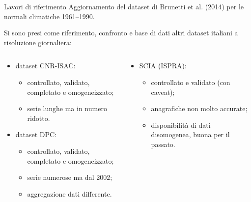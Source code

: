 \begin{frame}[t]{Lavori di riferimento}
  Aggiornamento del dataset di Brunetti et al. (2014) per le normali climatiche 1961--1990.

  Si sono presi come riferimento, confronto e base di dati altri dataset italiani a risoluzione giornaliera:
  \begin{columns}[t]
    \begin{column}{0.55\textwidth}
      \begin{itemize}
        \item dataset CNR-ISAC:
          \begin{itemize}
            \item controllato, validato, completato e omogeneizzato;
            \item serie lunghe ma in numero ridotto.
          \end{itemize}
        \item dataset DPC:
          \begin{itemize}
            \item controllato, validato, completato e omogeneizzato;
            \item serie numerose ma dal 2002;
            \item aggregazione dati differente.
          \end{itemize}
      \end{itemize}
    \end{column}
    \begin{column}{0.45\textwidth}
      \begin{itemize}
        \item SCIA (ISPRA):
          \begin{itemize}
            \item controllato e validato (con caveat);
            \item anagrafiche non molto accurate;
            \item disponibilità di dati disomogenea, buona per il passato.
          \end{itemize}
      \end{itemize}
    \end{column}
  \end{columns}
\end{frame}